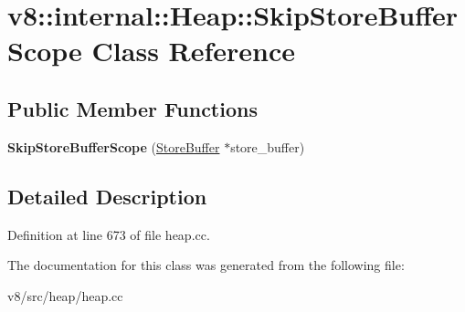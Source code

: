 \hypertarget{classv8_1_1internal_1_1Heap_1_1SkipStoreBufferScope}{}\section{v8\+:\+:internal\+:\+:Heap\+:\+:Skip\+Store\+Buffer\+Scope Class Reference}
\label{classv8_1_1internal_1_1Heap_1_1SkipStoreBufferScope}
\subsection*{Public Member Functions}
\begin{DoxyCompactItemize}
\item 
\mbox{\label{classv8_1_1internal_1_1Heap_1_1SkipStoreBufferScope_ac794c4dd3f461b172dd9cc70ac5c8a3d}} 
{\bfseries Skip\+Store\+Buffer\+Scope} (\mbox{\hyperlink{classv8_1_1internal_1_1StoreBuffer}{Store\+Buffer}} $\ast$store\+\_\+buffer)
\end{DoxyCompactItemize}


\subsection{Detailed Description}


Definition at line 673 of file heap.\+cc.



The documentation for this class was generated from the following file\+:\begin{DoxyCompactItemize}
\item 
v8/src/heap/heap.\+cc\end{DoxyCompactItemize}
